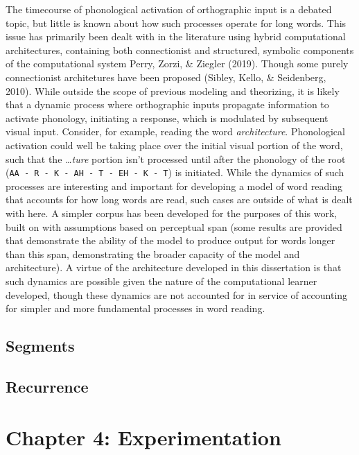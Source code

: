\documentclass[
  american,
  man,floatsintext]{apa6}
\begin{document}
The timecourse of phonological activation of orthographic input is a debated topic, but little is known about how such processes operate for long words. This issue has primarily been dealt with in the literature using hybrid computational architectures, containing both connectionist and structured, symbolic components of the computational system Perry, Zorzi, \& Ziegler (2019). Though some purely connectionist architetures have been proposed (Sibley, Kello, \& Seidenberg, 2010). While outside the scope of previous modeling and theorizing, it is likely that a dynamic process where orthographic inputs propagate information to activate phonology, initiating a response, which is modulated by subsequent visual input. Consider, for example, reading the word \emph{architecture}. Phonological activation could well be taking place over the initial visual portion of the word, such that the \emph{\ldots ture} portion isn't processed until after the phonology of the root (\texttt{AA\ -\ R\ -\ K\ -\ AH\ -\ T\ -\ EH\ -\ K\ -\ T}) is initiated. While the dynamics of such processes are interesting and important for developing a model of word reading that accounts for how long words are read, such cases are outside of what is dealt with here. A simpler corpus has been developed for the purposes of this work, built on with assumptions based on perceptual span (some results are provided that demonstrate the ability of the model to produce output for words longer than this span, demonstrating the broader capacity of the model and architecture). A virtue of the architecture developed in this dissertation is that such dynamics are possible given the nature of the computational learner developed, though these dynamics are not accounted for in service of accounting for simpler and more fundamental processes in word reading.

\hypertarget{segments}{%
\subsection{Segments}\label{segments}}

\hypertarget{recurrence}{%
\subsection{Recurrence}\label{recurrence}}

\hypertarget{chapter-4-experimentation}{%
\section{Chapter 4: Experimentation}\label{chapter-4-experimentation}}
\end{document}
